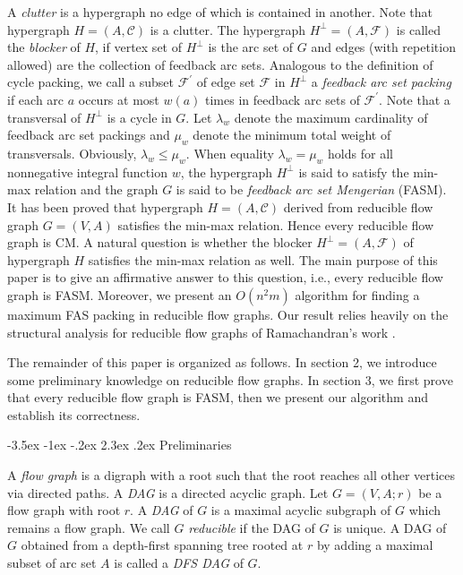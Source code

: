 \documentclass[11pt]{article}
\makeatletter
\renewcommand\section{%
  \@startsection{section}{1}
                {\z@}%
                {-3.5ex \@plus -1ex \@minus -.2ex}%
                {2.3ex \@plus.2ex}%
                {\large\bfseries}%
}
\makeatother
\begin{document}
A \emph{clutter} is a hypergraph no edge of which is contained in another. Note that hypergraph $H=(A,\mathcal{C})$ is a clutter. The hypergraph $H^\perp=(A,\mathcal{F})$ is called the \emph{blocker} of $H$, if vertex set of $H^\perp$ is the arc set of $G$ and edges (with repetition allowed) are the collection of feedback arc sets. Analogous to the definition of cycle packing, we call a subset $\mathcal{F}^\prime$ of edge set $\mathcal{F}$ in $H^\perp$ a \emph{feedback arc set packing} if each arc $a$ occurs at most $w(a)$ times in feedback arc sets of $\mathcal{F}^\prime$. Note that a transversal of $H^\perp$ is a cycle in $G$. Let $\lambda_w$ denote the maximum cardinality of feedback arc set packings and $\mu_w$ denote the minimum total weight of transversals. Obviously, $\lambda_w\leq\mu_w$. When equality $\lambda_w=\mu_w$ holds for all nonnegative integral function $w$, the hypergraph $H^\perp$ is said to satisfy the min-max relation and the graph $G$ is said to be \emph{feedback arc set Mengerian} (FASM). It has been proved that hypergraph $H=(A,\mathcal{C})$ derived from reducible flow graph $G=(V,A)$ satisfies the min-max relation. Hence every reducible flow graph is CM. A natural question is whether the blocker $H^\perp=(A,\mathcal{F})$ of hypergraph $H$ satisfies the min-max relation as well. The main purpose of this paper is to give an affirmative answer to this question, i.e., every reducible flow graph is FASM. Moreover, we present an $O(n^2 m)$ algorithm for finding a maximum FAS packing in reducible flow graphs. Our result relies heavily on the structural analysis for reducible flow graphs of Ramachandran's work \cite{Rama1,Rama2}.

The remainder of this paper is organized as follows. In section 2, we introduce some preliminary knowledge on reducible flow graphs. In section 3, we first prove that every reducible flow graph is FASM, then we present our algorithm and establish its correctness.

\section{Preliminaries}
\label{prel}

A \emph{flow graph} is a digraph with a root such that the root reaches all other vertices via directed paths.
A \emph{DAG} is a directed acyclic graph. Let $G=(V,A;r)$ be a flow graph with root $r$. 
A \emph{DAG} of $G$ is a maximal acyclic subgraph of $G$ which remains a flow graph. We call $G$ \emph{reducible} if the DAG of $G$ is unique. A DAG of $G$ obtained from a depth-first spanning tree rooted at $r$ by adding a maximal subset of arc set $A$ is called a \emph{DFS DAG} of $G$.
\end{document}
